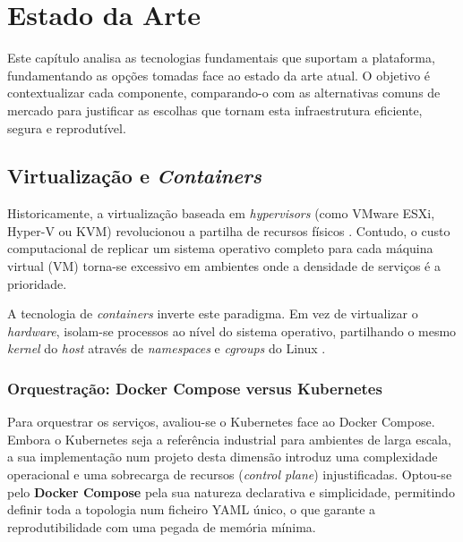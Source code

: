 \chapter{Estado da Arte}
\label{chap:estado_arte}

Este capítulo analisa as tecnologias fundamentais que suportam a plataforma, fundamentando as opções tomadas face ao estado da arte atual. O objetivo é contextualizar cada componente, comparando-o com as alternativas comuns de mercado para justificar as escolhas que tornam esta infraestrutura eficiente, segura e reprodutível.

\section{Virtualização e \textit{Containers}}

Historicamente, a virtualização baseada em \textit{hypervisors} (como VMware ESXi, Hyper-V ou KVM) revolucionou a partilha de recursos físicos \cite{vmware_workstation}. Contudo, o custo computacional de replicar um sistema operativo completo para cada máquina virtual (VM) torna-se excessivo em ambientes onde a densidade de serviços é a prioridade.

A tecnologia de \textit{containers} inverte este paradigma. Em vez de virtualizar o \textit{hardware}, isolam-se processos ao nível do sistema operativo, partilhando o mesmo \textit{kernel} do \textit{host} através de \textit{namespaces} e \textit{cgroups} do Linux \cite{docker_docs}.

\subsection{Orquestração: Docker Compose versus Kubernetes}
Para orquestrar os serviços, avaliou-se o Kubernetes face ao Docker Compose. Embora o Kubernetes seja a referência industrial para ambientes de larga escala, a sua implementação num projeto desta dimensão introduz uma complexidade operacional e uma sobrecarga de recursos (\textit{control plane}) injustificadas. Optou-se pelo \textbf{Docker Compose} pela sua natureza declarativa e simplicidade, permitindo definir toda a topologia num ficheiro YAML único, o que garante a reprodutibilidade com uma pegada de memória mínima.

